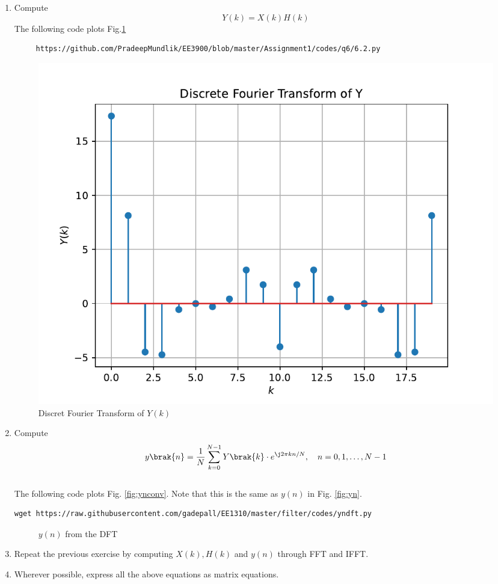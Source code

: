 \documentclass[journal,12pt,twocolumn]{IEEEtran}
\renewcommand\thesection{\arabic{section}}
\begin{document}
\begin{enumerate}[label=\thesection.\arabic*]
\item Compute 
\begin{equation}
Y(k) = X(k)H(k)
\end{equation}
\solution
The following code plots Fig.\ref{fig:6.2}
\begin{lstlisting}
     https://github.com/PradeepMundlik/EE3900/blob/master/Assignment1/codes/q6/6.2.py
\end{lstlisting}
\begin{figure}[!ht]
     \centering
     \includegraphics[width=\columnwidth]{figs/q6/6.2.pdf}
     \caption{Discret Fourier Transform of $Y(k)$}
     \label{fig:6.2}
\end{figure}

\item Compute
\begin{equation}
 y\brak{n}={\frac {1}{N}}\sum _{k=0}^{N-1}Y\brak{k}\cdot e^{\j 2\pi kn/N},\quad n = 0,1,\dots, N-1
\end{equation}
\\
\solution The following code plots Fig. \ref{fig:ynconv}. Note that this is the same as 
$y(n)$ in  Fig. 
\ref{fig:yn}. 
%
\begin{lstlisting}
wget https://raw.githubusercontent.com/gadepall/EE1310/master/filter/codes/yndft.py
\end{lstlisting}
\begin{figure}[!ht]
\centering
\caption{$y(n)$ from the DFT}
\label{fig:yndft}
\end{figure}
\item Repeat the previous exercise by computing $X(k), H(k)$ and $y(n)$ through FFT and 
IFFT.
\item Wherever possible, express all the above equations as matrix equations.
\end{enumerate}
\end{document}
